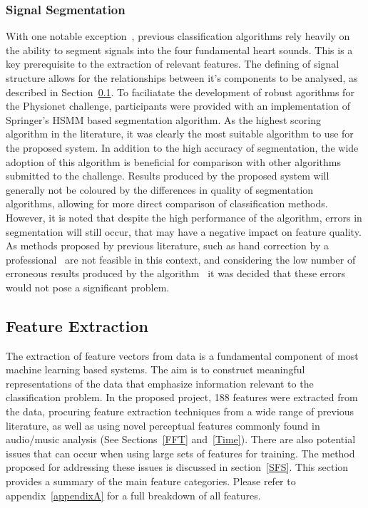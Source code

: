 \documentclass[titlepage, 12pt]{scrartcl} \usepackage{enumitem}
\begin{document}
\subsubsection{Signal Segmentation}
With one notable exception~\parencite{Langley2016}, previous classification
algorithms rely heavily on the ability to segment signals into the four
fundamental heart sounds. This is a key prerequisite to the extraction of
relevant features. The defining of signal structure allows for the
relationships between it's components to be analysed, as described in
Section~\ref{featEx}. To faciliatate the development of robust agorithms for
the Physionet challenge, participants were provided with an implementation of
Springer's HSMM based segmentation algorithm. As the highest scoring algorithm
in the literature, it was clearly the most suitable algorithm to use for the
proposed system. In addition to the high accuracy of segmentation, the wide
adoption of this algorithm is beneficial for comparison with other algorithms
submitted to the challenge. Results produced by the proposed system will
generally not be coloured by the differences in quality of segmentation
algorithms, allowing for more direct comparison of classification methods.
However, it is noted that despite the high performance of the algorithm, errors
in segmentation will still occur, that may have a negative impact on feature
quality. As methods proposed by previous literature, such as hand correction by
a professional~\parencite[p.2203]{Liu2016} are not feasible in this context,
and considering the low number of erroneous results produced by the
algorithm~\parencite[p.2]{Goda2016} it was decided that these errors would not
pose a significant problem.


\subsection{Feature Extraction}\label{featEx}
The extraction of feature vectors from data is a fundamental component of most
machine learning based systems. The aim is to construct meaningful
representations of the data that emphasize information relevant to the
classification problem. In the proposed project, 188 features were extracted
from the data, procuring feature extraction techniques from a wide range of
previous literature, as well as using novel perceptual features commonly found
in audio/music analysis (See Sections~\ref{FFT} and~\ref{Time}).
There are also potential issues that can occur when using large sets of
features for training. The method proposed for addressing these issues is
discussed in section~\ref{SFS}. This section provides a summary of the main
feature categories. Please refer to appendix~\ref{appendixA} for a full
breakdown of all features.
\end{document}
